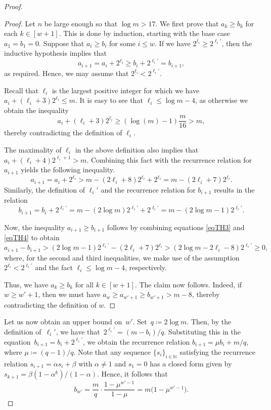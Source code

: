 \documentclass[11pt, final]{article}
\theoremstyle{definition}
\newcommand{\oldqed}{}
\def\endofClaim{\hfill\scalebox{.6}{$\Box$}}
\newenvironment{claimproof}[1][Proof]{
  \renewcommand{\oldqed}{\qedsymbol}
  \renewcommand{\qedsymbol}{\endofClaim}
  \begin{proof}[#1]}
  {\end{proof}
  \renewcommand{\qedsymbol}{\oldqed}}
\begin{document}
\begin{proof}
     \begin{claimproof}

     Let $n$ be large enough so that $\log m > 17$. We first prove that $a_k \geq b_k$ for each $k \in [w+1]$. This is done by induction, starting with the base case $a_1 = b_1 = 0$. Suppose that $a_i\geq b_i$ for some $i\leq w$. If we have $2^{\ell_i} \geq 2^{\ell_i'}$, then the inductive hypothesis implies that $$a_{i+1}=a_i +2^{\ell_i}\geq b_i+2^{\ell_i'}=b_{i+1},$$
     as required. Hence, we may assume that $2^{\ell_i} < 2^{\ell_i'}$. 
     
     Recall that $\ell_i$ is the largest positive integer for which we have $a_i + (\ell_i + 3)2^{\ell_i} \leq m$. It is easy to see that $\ell_i\leq \log m-4$, as otherwise we obtain the inequality  
     $$ a_i+(\ell_i+3)2^{\ell_i}\geq  (\log (m)-1) \frac m {16} > m,$$
     thereby contradicting the definition of $\ell_i$. 
     
     The maximality of $\ell_i$ in the above definition also implies that $a_i + (\ell_i + 4)2^{\ell_i+1} > m$. Combining this fact with the recurrence relation for $a_{i+1}$ yields the following inequality.
     \begin{equation}
         a_{i+1} = a_i + 2^{\ell_i} > m - (2\ell_i + 8)2^{\ell_i} + 2^{\ell_i} = m - (2\ell_i + 7)2^{\ell_i}.
         \label{eqTH3}
     \end{equation}
     Similarly, the definition of $\ell_i'$ and the recurrence relation for $b_{i+1}$ results in the relation
     \begin{equation}
         b_{i+1} = b_i + 2^{\ell_i'} = m - (2\log m)2^{\ell_i'} + 2^{\ell_i'}= m - (2\log m-1)2^{\ell_i'}.
         \label{eqTH4}
     \end{equation}
     
     Now, the inequality $a_{i+1} \geq b_{i+1}$ follows by combining equations \eqref{eqTH3} and \eqref{eqTH4} to obtain $$a_{i+1}-b_{i+1}>(2\log m-1)2^{\ell_i'}-(2\ell_i+7)2^{\ell_i}>(2\log m-2\ell_i-8)2^{\ell_i'} \geq 0,$$
     where, for the second and third inequalities, we make use of the assumption $2^{\ell_i} < 2^{\ell_i'}$ and the fact $\ell_i\leq \log m-4$, respectively. 
     
     Thus, we have $a_k \geq b_k$ for all $k \in [w+1]$. The claim now follows. Indeed, if $w \geq w' + 1$, then we must have $a_w \geq a_{w' +1} \geq b_{w'+1} > m-8$, thereby contradicting the definition of $w$.
     \end{claimproof}
    
     Let us now obtain an upper bound on~$w'$. Set~$q \coloneqq 2\log m$. Then, by the definition of~$\ell_i'$, we have that~$2^{\ell_i'} = (m - b_i)/q$. Substituting this in the equation~$b_{i+1} = b_i + 2^{\ell_i'}$, we obtain the recurrence relation $b_{i+1}=\mu b_i + m/q$, where $\mu \coloneqq (q-1)/q$.
     Note that any sequence $\{s_i\}_{i \in \mathbb{N}}$ satisfying the recurrence relation $s_{i+1} = \alpha s_i + \beta$ with $\alpha \neq 1$ and $s_1 = 0$ has a closed form given by $s_{k+1} = \beta (1 - \alpha^k)/(1 -\alpha)$. Hence, it follows that 
     $$b_{w'}=\frac{m}{q}\cdot \frac{1-{\mu}^{w'-1}}{1-\mu} = m \bigl(1 - \mu^{w' - 1}\bigr).$$ 
     

\end{proof}
\end{document}
